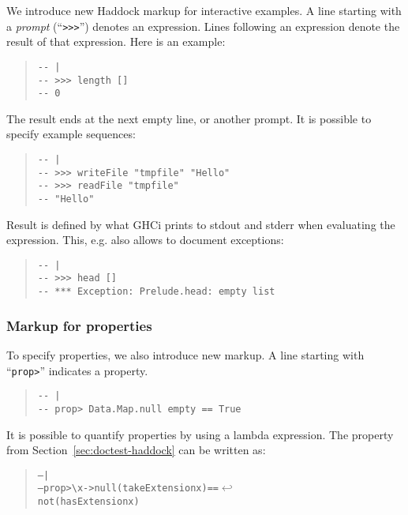 \documentclass[preprint]{sigplanconf}
\begin{document}
We introduce new Haddock markup for interactive examples.  A line
starting with a \emph{prompt} (``{\tt >>>}'') denotes an expression.
Lines following an expression denote the result of that expression.
Here is an example:

\begin{quote}
\small
\begin{verbatim}
-- |
-- >>> length []
-- 0
\end{verbatim}
\end{quote}

\noindent The result ends at the next empty line, or another prompt.
It is possible to specify example sequences:

\begin{quote}
\small
\begin{verbatim}
-- |
-- >>> writeFile "tmpfile" "Hello"
-- >>> readFile "tmpfile"
-- "Hello"
\end{verbatim}
\end{quote}

\noindent Result is defined by what GHCi prints to stdout and stderr
when evaluating the expression.  This, e.g. also allows to document
exceptions:

\begin{quote}
\small
\begin{verbatim}
-- |
-- >>> head []
-- *** Exception: Prelude.head: empty list
\end{verbatim}
\end{quote}

\subsubsection{Markup for properties}
\label{sec:markup}

\noindent To specify properties, we also introduce new markup. A line
starting with ``{\tt prop>}'' indicates a property.

\begin{quote}
\small
\begin{verbatim}
-- |
-- prop> Data.Map.null empty == True
\end{verbatim}
\end{quote}

\noindent It is possible to quantify properties by using a
lambda expression. The property from Section~\ref{sec:doctest-haddock}
can be written as:

\begin{quote}
\small
\begin{alltt}
-- |
-- prop> \verb|\|x -> null (takeExtension x) == \(\hookleftarrow\)
               not (hasExtension x)
\end{alltt}
\end{quote}
\end{document}
